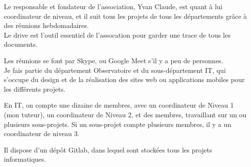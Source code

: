 Le responsable et fondateur de l'association, Yvan Claude, est quant à lui coordinateur de niveau, et il suit tous les projets de tous les départements grâce à des réunions hebdomadaires.\\

Le drive est l'outil essentiel de l'assocation pour garder une trace de tous les documents.

Les réunions se font par Skype, ou Google Meet s'il y a peu de personnes.\\

Je fais partie du département Observatoire et du sous-département IT, qui s'occupe 
du design et de la réalisation des sites web ou applications mobiles pour les différents projets.

En IT, on compte une dizaine de membres, avec un coordinateur de Niveau 1 (mon tuteur), un coordinateur de Niveau 2, et des membres, travaillant sur un ou plusieurs sous-projets.
Si un sous-projet compte plusieurs membres, il y a un coordinateur de niveau 3.

Il dispose d'un dépôt Gitlab, dans lequel sont stockées tous les projets informatiques.



